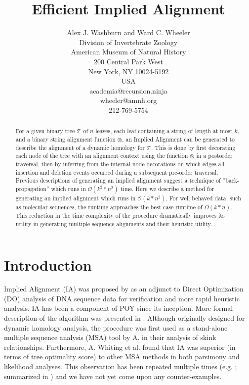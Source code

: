 \documentclass[11pt]{article}
\title{ \textbf{Efficient Implied Alignment}}
\author{Alex J. Washburn and Ward C. Wheeler\\
		Division of  Invertebrate Zoology\\
		American Museum of Natural History\\
		200 Central Park West\\
		New York, NY 10024-5192\\
		USA\\
		academia@recursion.ninja\\
		wheeler@amnh.org\\
		212-769-5754}
\begin{document}
\maketitle
\begin{abstract}
For a given binary tree $\mathcal{T}$ of $n$ leaves, each leaf containing a string of length at most $k$, and a binary string alignment function $\otimes$, an Implied Alignment can be generated to describe the alignment of a dynamic homology for $\mathcal{T}$.
This is done by first decorating each node of the tree with an alignment context using the function $\otimes$ in a postorder traversal, then by inferring from the internal node decorations on which edges all insertion and deletion events occurred during a subsequent pre-order traversal.
Previous descriptions of generating an implied alignment suggest a technique of ``back-propagation'' which runs in $\mathcal{O}(k^2 * n^2)$ time.
Here we describe a method for generating an implied alignment which runs in \textsc{$\mathcal{O}(k * n^2)$}.
For well behaved data, such as molecular sequences, the runtime approaches the best case runtime of \textsc{$\Omega(k * n)$}.
This reduction in the time complexity of the procedure dramatically improves its utility in generating multiple sequence alignments and their heuristic utility.
\end{abstract}
\newpage
\tableofcontents
\newpage


\section{Introduction}
Implied Alignment (IA) was proposed by \cite{Wheeler2003} as an adjunct to Direct Optimization (DO) \citep{Wheeler1996,VaronandWheeler2012} analysis of DNA sequence data for verification and more rapid heuristic analysis.
IA has been a component of POY \citep{Wheeleretal2015, POY5} since its inception.
More formal description of the algorithm was presented in \cite{Wheeleretal2006}.
Although originally designed for dynamic homology \citep{Wheeler2001} analysis, the procedure was first used as a stand-alone multiple sequence analysis (MSA) tool by A. \cite{WhitingAetal2006} in their analysis of skink relationships. 
Furthermore, A. Whiting et al. found that IA was superior (in terms of tree optimality score) to other MSA methods in both parsimony and likelihood analyses.
This observation has been repeated multiple times (e.g. \citealp{LindgrenandDaly2007, FordandWheeler2015}; summarized in \citealp{Wheeler2012}) and we have not yet come upon any counter-examples.
\end{document}
